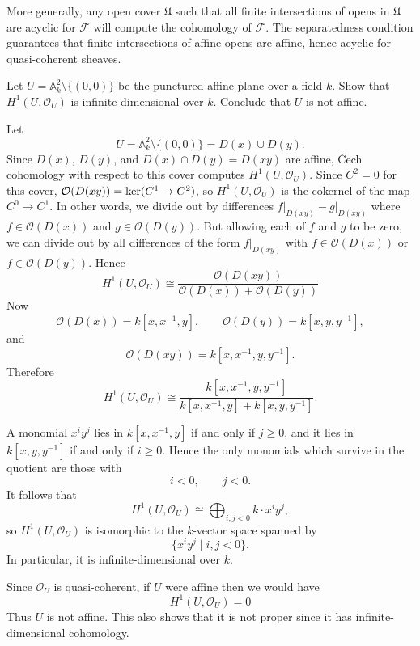 \documentclass[12pt]{article}
\begin{document}
More generally, any open cover $\mathfrak U$ such that all finite intersections of opens in $\mathfrak U$ are acyclic for $\mathcal F$ will compute the cohomology of $\mathcal F$. The separatedness condition guarantees that finite intersections of affine opens are affine, hence acyclic for quasi-coherent sheaves.


\begin{exercise}
    Let $U = \mathbb A^2_k \setminus \{(0,0)\}$ be the punctured affine plane over a field $k$. Show that $H^1(U,\mathcal O_U)$ is infinite-dimensional over $k$. Conclude that $U$ is not affine.
\end{exercise}

\begin{solution}
    Let
    \[
        U = \mathbb A^2_k \setminus \{(0,0)\} = D(x)\cup D(y).
    \]
    Since \(D(x)\), \(D(y)\), and \(D(x)\cap D(y)=D(xy)\) are affine, Čech cohomology with respect to this cover computes \(H^1(U,\mathcal O_U)\). Since $C^2 = 0$ for this cover, ${\mathcal{O}}(D(xy)) = \ker(C^1 \to C^2)$, so $H^1(U,\mathcal O_U)$ is the cokernel of the map $C^0 \to C^1$. In other words, we divide out by differences $f\vert_{D(xy)} - g\vert_{D(xy)}$ where $f\in \mathcal O(D(x))$ and $g\in \mathcal O(D(y))$. But allowing each of $f$ and $g$ to be zero, we can divide out by all differences of the form $f\vert_{D(xy)}$ with $f\in \mathcal O(D(x))$ or $f\in \mathcal O(D(y))$. Hence
    \[
        H^1(U,\mathcal O_U)\cong
        \frac{\mathcal O(D(xy))}{\mathcal O(D(x))+\mathcal O(D(y))}
    \]
    Now
    \[
        \mathcal O(D(x))=k[x,x^{-1},y],\qquad
        \mathcal O(D(y))=k[x,y,y^{-1}],
    \]
    and
    \[
        \mathcal O(D(xy))=k[x,x^{-1},y,y^{-1}].
    \]
    Therefore
    \[
        H^1(U,\mathcal O_U)
        \cong
        \frac{k[x,x^{-1},y,y^{-1}]}
        {k[x,x^{-1},y]+k[x,y,y^{-1}]}.
    \]

    A monomial \(x^i y^j\) lies in \(k[x,x^{-1},y]\) if and only if \(j\ge 0\), and it lies in \(k[x,y,y^{-1}]\) if and only if \(i\ge 0\). Hence the only monomials which survive in the quotient are those with
    \[
        i<0,\qquad j<0.
    \]
    It follows that
    \[
        H^1(U,\mathcal O_U)\cong \bigoplus_{i,j<0} k\cdot x^i y^j,
    \]
    so \(H^1(U,\mathcal O_U)\) is isomorphic to the \(k\)-vector space spanned by
    \[
        \{x^i y^j \mid i,j<0\}.
    \]
    In particular, it is infinite-dimensional over \(k\).

    Since \(\mathcal O_U\) is quasi-coherent, if \(U\) were affine then we would have
    \[ H^1(U,\mathcal O_U)=0 \] Thus \(U\) is not affine. This also shows that it is not proper since it has infinite-dimensional cohomology.
\end{solution}
\end{document}
